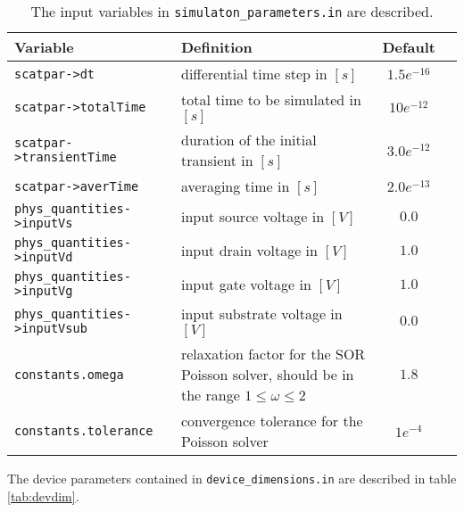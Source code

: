 \begin{table}[ht!]
\centering
\begin{tabular}{|l|p{7cm}|c|c|}
\hline
\textbf{Variable}                    &  \textbf{Definition}                           &  \textbf{Default} \\
\hline
\texttt{scatpar->dt}                 &  differential time step in $[s]$               &  $1.5e^{-16}$ \\
\hline
\texttt{scatpar->totalTime}          &  total time to be simulated in $[s]$           &  $10e^{-12}$ \\
\hline
\texttt{scatpar->transientTime}      &  duration of the initial transient in $[s]$    &  $3.0e^{-12}$ \\
\hline
\texttt{scatpar->averTime}           &  averaging time in $[s]$                       &  $2.0e^{-13}$ \\
\hline
\texttt{phys\_quantities->inputVs}   &  input source voltage in $[V]$                 &  $0.0$ \\
\hline
\texttt{phys\_quantities->inputVd}   &  input drain voltage in $[V]$                  &  $1.0$\\
\hline
\texttt{phys\_quantities->inputVg}   &  input gate voltage in $[V]$                   &  $1.0$ \\
\hline
\texttt{phys\_quantities->inputVsub} &  input substrate voltage in $[V]$              &  $0.0$\\
\hline
\texttt{constants.omega}             &  relaxation factor for the SOR Poisson solver, should be in the range $1 \leq \omega \leq 2$  &  $1.8$ \\
\hline
\texttt{constants.tolerance}         &  convergence tolerance for the Poisson solver  &  $1e^{-4}$\\
\hline
\end{tabular}
\caption{The input variables in \texttt{simulaton\_parameters.in} are described.}
\label{tab:simpar}
\end{table}

The device parameters contained in \texttt{device\_dimensions.in} are described in table \ref{tab:devdim}.

